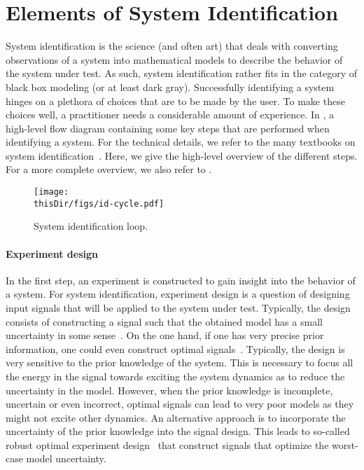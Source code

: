 \section{Elements of System Identification}
System identification is the science (and often art) that deals with converting observations of a system into mathematical models to describe the behavior of the system under test.
As such, system identification rather fits in the category of black box modeling (or at least dark gray).
Successfully identifying a system hinges on a plethora of choices that are to be made by the user.
To make these choices well, a practitioner needs a considerable amount of experience. 
In , a high-level flow diagram containing some key steps that are performed when identifying a system.
For the technical details, we refer to the many textbooks on system identification~\citep{Keesman2011,Norton1986,Soderstrom1989,Ljung1999,Pintelon2012}.
Here, we give the high-level overview of the different steps.
For a more complete overview, we also refer to \citet{Ljung2010}.

\begin{figure}
  \centering
  \texttt{[image: \\thisDir/figs/id-cycle.pdf]}
  \caption[System identification loop]{System identification loop. }
  \label{fig:intro:identification-cycle}
\end{figure}

\paragraph{Experiment design}
In the first step, an experiment is constructed to gain insight into the behavior of a system.
For system identification, experiment design is a question of designing input signals that will be applied to the system under test.
Typically, the design consists of constructing a signal such that the obtained model  has a small uncertainty in some sense~\citep{Goodwin1977,Goodwin2006GBO}.
On the one hand, if one has very precise prior information, one could even construct optimal signals~\citep{Gevers2011ExpDesign}.
Typically, the design is very sensitive to the prior knowledge of the system.
This is necessary to focus all the energy in the signal towards exciting the system dynamics as to reduce the uncertainty in the model.
However, when the prior knowledge is incomplete, uncertain or even incorrect, optimal signals can lead to very poor models as they might not excite other dynamics.
An alternative approach is to incorporate the uncertainty of the prior knowledge into the signal design.
This leads to so-called robust optimal experiment design~\citep{Rojas2012,Goodwin2006} that construct signals that optimize the worst-case model uncertainty.

